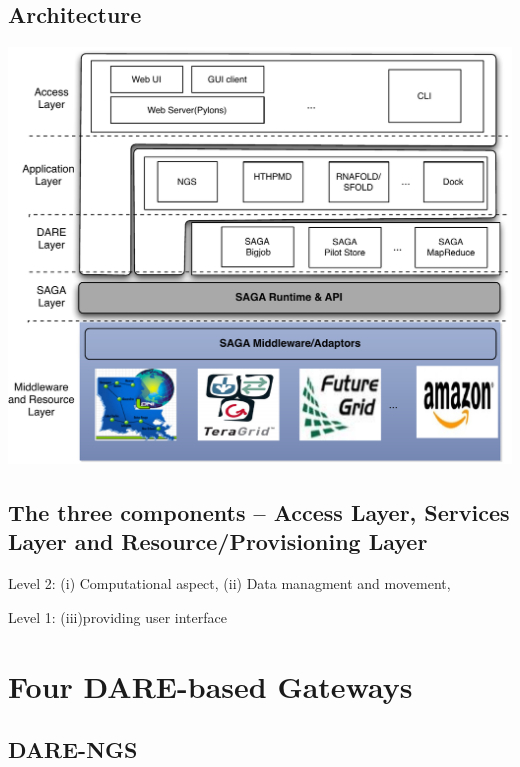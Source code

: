 \documentclass[12pt]{article}
\begin{document}
\subsection{Architecture}

\includegraphics[scale=0.70]{figures/DAREOutline.pdf}

\subsection{The three components -- Access Layer, Services Layer and
  Resource/Provisioning Layer} 

Level 2: (i) Computational aspect, (ii) Data managment and movement, 

Level 1: (iii)providing user interface

\section{Four DARE-based Gateways}
\subsection{DARE-NGS}
\end{document}
